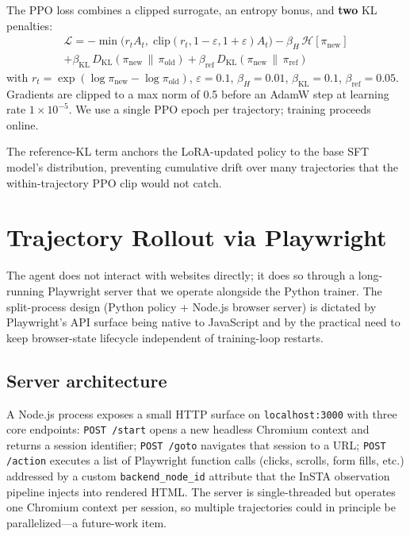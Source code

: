 \documentclass[12pt,a4paper]{report}
\begin{document}
The PPO loss combines a clipped surrogate, an entropy bonus, and \textbf{two} KL penalties:
\begin{equation}
\begin{split}
  \mathcal{L} = -\min\!\big( r_t A_t,\; \text{clip}(r_t, 1-\varepsilon, 1+\varepsilon) A_t \big) - \beta_H\,\mathcal{H}[\pi_\text{new}] \\
              + \beta_\text{KL}\,D_\text{KL}(\pi_\text{new} \,\|\, \pi_\text{old}) + \beta_\text{ref}\,D_\text{KL}(\pi_\text{new} \,\|\, \pi_\text{ref})
\end{split}
\end{equation}
with $r_t = \exp(\log \pi_\text{new} - \log \pi_\text{old})$, $\varepsilon = 0.1$, $\beta_H = 0.01$, $\beta_\text{KL} = 0.1$, $\beta_\text{ref} = 0.05$. Gradients are clipped to a max norm of 0.5 before an AdamW step at learning rate $1\times 10^{-5}$. We use a single PPO epoch per trajectory; training proceeds online.

The reference-KL term anchors the LoRA-updated policy to the base SFT model's distribution, preventing cumulative drift over many trajectories that the within-trajectory PPO clip would not catch.

\section{Trajectory Rollout via Playwright}\label{sec:rollout}

The agent does not interact with websites directly; it does so through a long-running Playwright server that we operate alongside the Python trainer. The split-process design (Python policy + Node.js browser server) is dictated by Playwright's API surface being native to JavaScript and by the practical need to keep browser-state lifecycle independent of training-loop restarts.

\subsection*{Server architecture}

A Node.js process exposes a small HTTP surface on \texttt{localhost:3000} with three core endpoints: \texttt{POST /start} opens a new headless Chromium context and returns a session identifier; \texttt{POST /goto} navigates that session to a URL; \texttt{POST /action} executes a list of Playwright function calls (clicks, scrolls, form fills, etc.) addressed by a custom \texttt{backend\_node\_id} attribute that the InSTA observation pipeline injects into rendered HTML. The server is single-threaded but operates one Chromium context per session, so multiple trajectories could in principle be parallelized---a future-work item.
\end{document}
